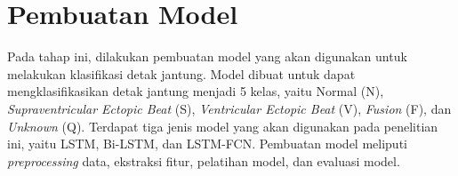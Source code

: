 %
%
%

\section{Pembuatan Model}
\label{subsec: metodologi-pembuatan-model}
Pada tahap ini, dilakukan pembuatan model yang akan digunakan untuk melakukan klasifikasi detak jantung.
Model dibuat untuk dapat mengklasifikasikan detak jantung menjadi 5 kelas, yaitu Normal (N), \textit{Supraventricular Ectopic Beat} (S), \textit{Ventricular Ectopic Beat} (V), \textit{Fusion} (F), dan \textit{Unknown} (Q).
Terdapat tiga jenis model yang akan digunakan pada penelitian ini, yaitu LSTM, Bi-LSTM, dan LSTM-FCN.
Pembuatan model meliputi \textit{preprocessing} data, ekstraksi fitur, pelatihan model, dan evaluasi model.

